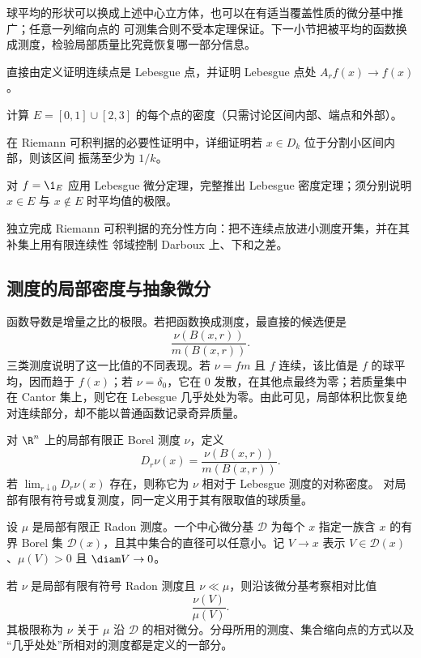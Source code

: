 球平均的形状可以换成上述中心立方体，也可以在有适当覆盖性质的微分基中推广；任意一列缩向点的
可测集合则不受本定理保证。下一小节把被平均的函数换成测度，检验局部质量比究竟恢复哪一部分信息。

\begin{exercise}
直接由定义证明连续点是 Lebesgue 点，并证明 Lebesgue 点处 $A_rf(x)\to f(x)$。
\end{exercise}
\begin{exercise}
计算 $E=[0,1]\cup[2,3]$ 的每个点的密度（只需讨论区间内部、端点和外部）。
\end{exercise}
\begin{exercise}
在 Riemann 可积判据的必要性证明中，详细证明若 $x\in D_k$ 位于分割小区间内部，则该区间
振荡至少为 $1/k$。
\end{exercise}
\begin{exercise}
对 $f=\1_E$ 应用 Lebesgue 微分定理，完整推出 Lebesgue 密度定理；须分别说明 $x\in E$ 与
$x\notin E$ 时平均值的极限。
\end{exercise}
\begin{exercise}
独立完成 Riemann 可积判据的充分性方向：把不连续点放进小测度开集，并在其补集上用有限连续性
邻域控制 Darboux 上、下和之差。
\end{exercise}

\subsection{测度的局部密度与抽象微分}\label{subsec:4-1-3}

函数导数是增量之比的极限。若把函数换成测度，最直接的候选便是
\[
 \frac{\nu(B(x,r))}{m(B(x,r))}.
\]
三类测度说明了这一比值的不同表现。若 $\nu=fm$ 且 $f$ 连续，该比值是 $f$ 的球平均，因而趋于
$f(x)$；若 $\nu=\delta_0$，它在 $0$ 发散，在其他点最终为零；若质量集中在 Cantor 集上，则它在
Lebesgue 几乎处处为零。由此可见，局部体积比恢复绝对连续部分，却不能以普通函数记录奇异质量。

\begin{definition}[测度密度比]\label{def:4-1-3-1}
对 $\R^n$ 上的局部有限正 Borel 测度 $\nu$，定义
\[
 D_r\nu(x)=\frac{\nu(B(x,r))}{m(B(x,r))}.
\]
若 $\lim_{r\downarrow0}D_r\nu(x)$ 存在，则称它为 $\nu$ 相对于 Lebesgue 测度的对称密度。
对局部有限有符号或复测度，同一定义用于其有限取值的球质量。
\end{definition}

\begin{definition}[中心微分基与相对微分]\label{def:4-1-3-2}
设 $\mu$ 是局部有限正 Radon 测度。一个中心微分基 $\mathcal D$ 为每个 $x$ 指定一族含 $x$ 的有界
Borel 集 $\mathcal D(x)$，且其中集合的直径可以任意小。记 $V\to x$ 表示
$V\in\mathcal D(x)$、$\mu(V)>0$ 且 $\diam V\to0$。

若 $\nu$ 是局部有限有符号 Radon 测度且 $\nu\ll\mu$，则沿该微分基考察相对比值
\[
 \frac{\nu(V)}{\mu(V)}.
\]
其极限称为 $\nu$ 关于 $\mu$ 沿 $\mathcal D$ 的相对微分。分母所用的测度、集合缩向点的方式以及
“几乎处处”所相对的测度都是定义的一部分。
\end{definition}

